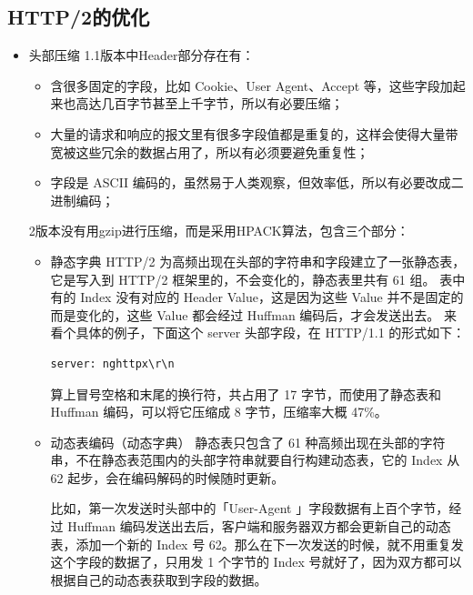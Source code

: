 \documentclass[11pt]{article}
\begin{document}
\subsection{HTTP/2的优化}
\label{sec:org8f61b77}
\begin{itemize}
\item 头部压缩
1.1版本中Header部分存在有：
\begin{itemize}
\item 含很多固定的字段，比如 Cookie、User Agent、Accept 等，这些字段加起来也高达几百字节甚至上千字节，所以有必要压缩；
\item 大量的请求和响应的报文里有很多字段值都是重复的，这样会使得大量带宽被这些冗余的数据占用了，所以有必须要避免重复性；
\item 字段是 ASCII 编码的，虽然易于人类观察，但效率低，所以有必要改成二进制编码；
\end{itemize}
2版本没有用gzip进行压缩，而是采用HPACK算法，包含三个部分：
\begin{itemize}
\item 静态字典
HTTP/2 为高频出现在头部的字符串和字段建立了一张静态表，它是写入到 HTTP/2 框架里的，不会变化的，静态表里共有 61 组。
表中有的 Index 没有对应的 Header Value，这是因为这些 Value 并不是固定的而是变化的，这些 Value 都会经过 Huffman 编码后，才会发送出去。
来看个具体的例子，下面这个 server 头部字段，在 HTTP/1.1 的形式如下：
\begin{verbatim}
server: nghttpx\r\n
\end{verbatim}
算上冒号空格和末尾的换行符，共占用了 17 字节，而使用了静态表和 Huffman 编码，可以将它压缩成 8 字节，压缩率大概 47\%。
\item 动态表编码（动态字典）
静态表只包含了 61 种高频出现在头部的字符串，不在静态表范围内的头部字符串就要自行构建动态表，它的 Index 从 62 起步，会在编码解码的时候随时更新。

比如，第一次发送时头部中的「User-Agent 」字段数据有上百个字节，经过 Huffman 编码发送出去后，客户端和服务器双方都会更新自己的动态表，添加一个新的 Index 号 62。那么在下一次发送的时候，就不用重复发这个字段的数据了，只用发 1 个字节的 Index 号就好了，因为双方都可以根据自己的动态表获取到字段的数据。


\end{itemize}
\end{itemize}
\end{document}
